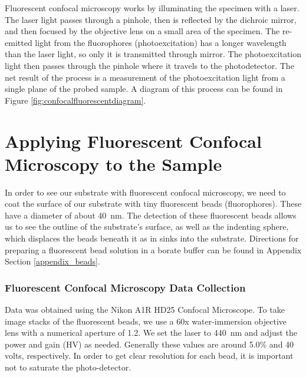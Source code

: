 Fluorescent confocal microscopy works by illuminating the specimen with a laser. The laser light passes through a pinhole, then is reflected by the dichroic mirror, and then focused by the objective lens on a small area of the specimen. The re-emitted light from the fluorophores (photoexcitation) has a longer wavelength than the laser light, so only it is transmitted through mirror. The photoexcitation light then passes through the pinhole where it travels to the photodetector. The net result of the process is a measurement of the photoexcitation light from a single plane of the probed sample. A diagram of this process can be found in Figure \ref{fig:confocalfluorescentdiagram}.

\section{Applying Fluorescent Confocal Microscopy to the Sample}
In order to see our substrate with fluorescent confocal microscopy, we need to coat the surface of our substrate with tiny fluorescent beads (fluorophores). These have a diameter of about 40~nm. The detection of these fluorescent beads allows us to see the outline of the substrate's surface, as well as the indenting sphere, which displaces the beads beneath it as in sinks into the substrate. Directions for preparing a fluorescent bead solution in a borate buffer can be found in Appendix Section \ref{appendix_beads}. 

\subsubsection{Fluorescent Confocal Microscopy Data Collection}
Data was obtained using the Nikon A1R HD25 Confocal Microscope. To take image stacks of the fluorescent beads, we use a 60x water-immersion objective lens with a numerical aperture of 1.2. We set the laser to 440~nm and adjust the power and gain (HV) as needed. Generally these values are around 5.0\% and 40 volts, respectively. In order to get clear resolution for each bead, it is important not to saturate the photo-detector. 

